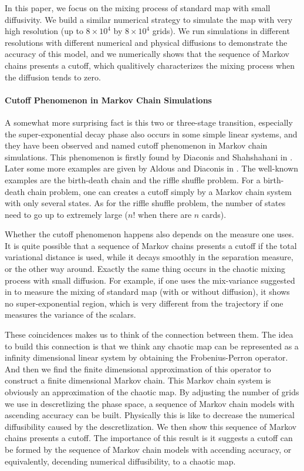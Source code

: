 \documentclass{article}
\begin{document}
In this paper, we focus on the mixing process of standard map with small diffusivity. We build a similar numerical strategy to simulate the map with very high resolution (up to $8 \times 10^4$ by $8 \times 10^4$ grids). We run simulations in different resolutions with different numerical and physical diffusions to demonstrate the accuracy of this model, and we numerically shows that the sequence of Markov chains presents a cutoff, which qualitively characterizes the mixing process when the diffusion tends to zero. 




\paragraph{Cutoff Phenomenon in Markov Chain Simulations}
A somewhat more surprising fact is this two or three-stage transition, especially the super-exponential decay phase also occurs in some simple linear systems, and they have been observed and named cutoff phenomenon in Markov chain simulations. This phenomenon is firstly found by Diaconis and Shahshahani in \cite{Diaconis1981}. Later some more examples are given by Aldous and Diaconis in \cite{Diaconis1986}. The well-known examples are the birth-death chain \cite{Diaconis2005} and the
riffle shuffle problem\cite{Diaconis1996}\cite{Diaconis2001}. For a birth-death chain problem, one can creates a cutoff simply by a Markov chain system with only several states. As for the riffle shuffle problem, the number of states need to go up to extremely large ($n!$ when there are $n$ cards). 


Whether the cutoff phenomenon happens also depends on the measure one uses\cite{Diaconis2005}. It is quite possible that 
a sequence of Markov chains presents a cutoff if the total variational distance is used, while it decays smoothly in the separation measure, or the other way around. Exactly the same thing occurs in the chaotic mixing process with small diffusion. For example, if one uses the mix-variance suggested in \cite{Mezic2005} to measure the mixing of standard map (with or without diffusion), it shows no super-exponential region, which is very different from the trajectory
if one measures the variance of the scalars. 

These coincidences makes us to think of the connection between them. The idea to build this connection is that we think any chaotic map can be represented as a infinity dimensional linear system by obtaining the Frobenius-Perron operator. And then we find the finite dimensional approximation of this operator to construct a finite dimensional Markov chain. This Markov chain system is obviously an approximation of the chaotic map. By adjusting the number of grids we use in descretlizing the phase space, a sequence of Markov chain models with ascending accuracy can be built. Physically this is like to decrease the numerical diffusibility caused by the descretlization. We then show this sequence of Markov chains presents a cutoff. The importance of this result is it suggests a cutoff can be formed by the sequence of Markov chain models with accending accuracy, or equivalently, decending numerical diffusibility, to a chaotic map. 
\end{document}
